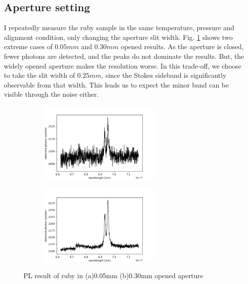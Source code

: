 \documentclass{article}
\begin{document}
\subsection{Aperture setting}
\label{result:aperture_effect}
 I repeatedly measure the ruby sample in the same temperature, pressure and alignment condition, only changing the aperture slit width.
 Fig. \ref{fig:s5_s30_difference} shows two extreme cases of $0.05 mm$ and $0.30 mm$ opened results.
 As the aperture is closed, fewer photons are detected, and the peaks do not dominate the results.
 But, the widely opened aperture makes the resolution worse.
 In this trade-off, we choose to take the slit width of $0.25 mm$, since the Stokes sideband is significantly observable from that width.
 This leads us to expect the minor band can be visible through the noise either.
 

 \begin{figure}[ht]
  \centering
  \begin{subfigure}[b]{6cm}
      \centering
      \includegraphics[width=6cm]{../results/Ruby s5-1_raw_fig.png}
      \caption{}
  \end{subfigure}
  \hfill
  \begin{subfigure}[b]{6cm}
      \centering
      \includegraphics[width=6cm]{../results/Ruby s30-1_raw_fig.png}
      \caption{}
  \end{subfigure}
  \hfill
  \caption{PL result of ruby in (a)0.05mm (b)0.30mm opened aperture}
  \label{fig:s5_s30_difference}
\end{figure}
 
\end{document}
